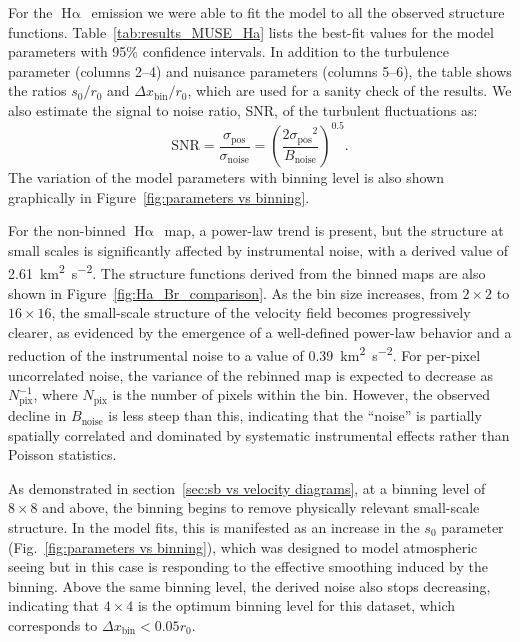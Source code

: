 \documentclass[fleqn,usenatbib, useAMS, a4paper]{mnras}
\newcommand\pos{\ensuremath{_{\mathrm{pos}}}}
\newcommand\ha{\ensuremath{\text{H}\upalpha}}
\newcommand\halpha{\ha}
\newcommand\binsize{\ensuremath{\Delta x_{\text{bin}}}}
\begin{document}
For the \halpha\ emission we were able to fit the model to all the observed structure functions. Table~\ref{tab:results_MUSE_Ha} lists the best-fit values for the model parameters with 95\% confidence intervals.
In addition to the turbulence parameter (columns 2--4)
and nuisance parameters (columns 5--6),
the table shows
the ratios \(s_0/r_0\) and \(\binsize{} / r_0\), which are used for a sanity check of the results.
We also estimate the signal to noise ratio, SNR, of the turbulent fluctuations as:
%
\begin{equation}\label{eq:SNR}
  \text{SNR} = \frac{\sigma\pos}{\sigma_\text{noise}} = \left( \frac{2 \sigma\pos^2}{B_\text{noise}} \right)^{0.5}.
\end{equation}
The variation of the model parameters with binning level is also shown graphically in Figure~\ref{fig:parameters vs binning}.

For the non-binned \halpha\ map, a power-law trend is present, but the structure at small scales is significantly affected by instrumental noise, with a derived value of \qty{2.61}{km^{2}.s^{-2}}.  
The structure functions derived from the binned maps are also shown in Figure~\ref{fig:Ha_Br_comparison}.  
As the bin size increases, from \(2\times2\) to \(16\times16\), the small-scale structure of the velocity field becomes progressively clearer, as evidenced by the emergence of a well-defined power-law behavior and a reduction of the instrumental noise to a value of \qty{0.39}{km^{2}.s^{-2}}.  
For per-pixel uncorrelated noise, the variance of the rebinned map is expected to decrease as \(N_{\mathrm{pix}}^{-1}\), where \(N_{\mathrm{pix}}\) is the number of pixels within the bin. 
However, the observed decline in \(B_\text{noise}\) is less steep than this, indicating that the ``noise'' is partially spatially correlated and dominated by systematic instrumental effects rather than Poisson statistics.

As demonstrated in section~\ref{sec:sb vs velocity diagrams}, at a binning level of \(8 \times 8\) and above,
the binning begins to remove physically relevant small-scale structure.
In the model fits, this is manifested as an increase in the \(s_0\) parameter
(Fig.~\ref{fig:parameters vs binning}),
which was designed to model atmospheric seeing but in this case is responding to the effective smoothing induced by the binning.
Above the same binning level, the derived noise also stops decreasing, indicating
that \(4 \times 4\) is the optimum binning level for this dataset,
which corresponds to \(\binsize{} < 0.05 r_0\).
\end{document}
